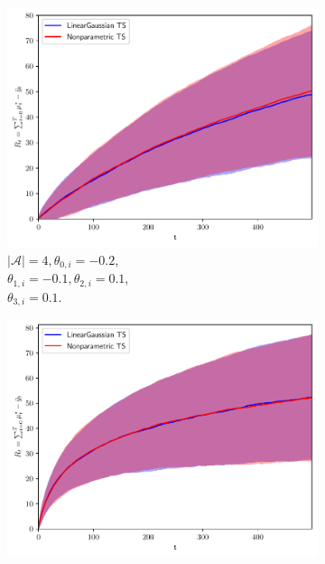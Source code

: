 \begin{figure}[!h]
	\begin{subfigure}[b]{0.32\textwidth}
		\includegraphics[width=\textwidth]{./figs/linearGaussian/cumregret_A4_-02_-02_-01_-01_01_01_02_02_1_1_1_1}
		\vspace*{-5ex}
		\caption{$|\mathcal{A}|=4, \theta_{0,i}=-0.2$,\\ \hspace*{0.3cm} $\theta_{1,i}=-0.1, \theta_{2,i}=0.1$,\\ \hspace*{0.3cm} $\theta_{3,i}=0.1$.}
		\label{fig:linear_gaussian_A4_01}
	\end{subfigure}
	\begin{subfigure}[b]{0.32\textwidth}
		\includegraphics[width=\textwidth]{./figs/linearGaussian/cumregret_A4_-1_-1_-05_-05_05_05_1_1_1_1_1_1}

\end{subfigure}
\end{figure}
